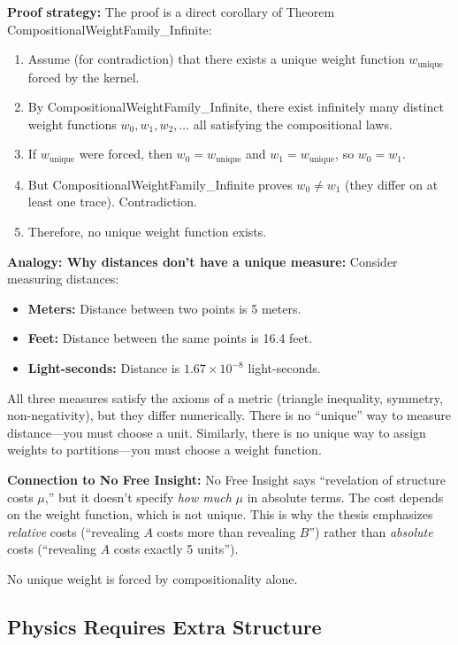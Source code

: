 \textbf{Proof strategy:} The proof is a direct corollary of Theorem CompositionalWeightFamily\_Infinite:
\begin{enumerate}
    \item Assume (for contradiction) that there exists a unique weight function $w_{\text{unique}}$ forced by the kernel.
    \item By CompositionalWeightFamily\_Infinite, there exist infinitely many distinct weight functions $w_0, w_1, w_2, \ldots$ all satisfying the compositional laws.
    \item If $w_{\text{unique}}$ were forced, then $w_0 = w_{\text{unique}}$ and $w_1 = w_{\text{unique}}$, so $w_0 = w_1$.
    \item But CompositionalWeightFamily\_Infinite proves $w_0 \neq w_1$ (they differ on at least one trace). Contradiction.
    \item Therefore, no unique weight function exists.
\end{enumerate}

\textbf{Analogy: Why distances don't have a unique measure:}
Consider measuring distances:
\begin{itemize}
    \item \textbf{Meters:} Distance between two points is 5 meters.
    \item \textbf{Feet:} Distance between the same points is 16.4 feet.
    \item \textbf{Light-seconds:} Distance is $1.67 \times 10^{-8}$ light-seconds.
\end{itemize}
All three measures satisfy the axioms of a metric (triangle inequality, symmetry, non-negativity), but they differ numerically. There is no ``unique'' way to measure distance---you must choose a unit. Similarly, there is no unique way to assign weights to partitions---you must choose a weight function.

\textbf{Connection to No Free Insight:} No Free Insight says ``revelation of structure costs $\mu$,'' but it doesn't specify \textit{how much} $\mu$ in absolute terms. The cost depends on the weight function, which is not unique. This is why the thesis emphasizes \textit{relative} costs (``revealing $A$ costs more than revealing $B$'') rather than \textit{absolute} costs (``revealing $A$ costs exactly 5 units'').


No unique weight is forced by compositionality alone.

\subsection{Physics Requires Extra Structure}


